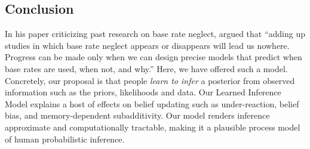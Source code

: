 \subsection{Conclusion}

In his paper criticizing past research on base rate neglect, \cite{gigerenzer1996narrow} argued that ``adding up studies in which base rate neglect appears or disappears will lead us nowhere. Progress can be made only when we can design precise models that predict when base rates are used, when not, and why.'' Here, we have offered such a model. Concretely, our proposal is that people \emph{learn to infer} a posterior from observed information such as the priors, likelihoods and data. Our Learned Inference Model explains a host of effects on belief updating such as under-reaction, belief bias, and memory-dependent subadditivity. Our model renders inference approximate and computationally tractable, making it a plausible process model of human probabilistic inference.


